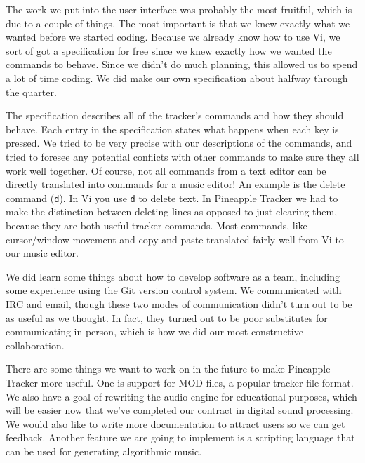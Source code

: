 \documentclass[12pt,letterpaper]{article}
\begin{document}

\par
The work we put into the user interface was probably the most fruitful, which is due to a couple of things.
The most important is that we knew exactly what we wanted before we started coding.
Because we already know how to use Vi, we sort of got a specification for free since we knew exactly how we wanted the commands to behave.
Since we didn't do much planning, this allowed us to spend a lot of time coding.
We did make our own specification about halfway through the quarter.

\par
The specification describes all of the tracker's commands and how they should behave.
Each entry in the specification states what happens when each key is pressed.
We tried to be very precise with our descriptions of the commands, and tried to foresee any potential conflicts with other commands to make sure they all work well together.
Of course, not all commands from a text editor can be directly translated into commands for a music editor!
An example is the delete command ({\tt d}).
In Vi you use {\tt d} to delete text.
In Pineapple Tracker we had to make the distinction between deleting lines as opposed to just clearing them, because they are both useful tracker commands.
Most commands, like cursor/window movement and copy and paste translated fairly well from Vi to our music editor.

\par
We did learn some things about how to develop software as a team, including some experience using the Git version control system.
We communicated with IRC and email, though these two modes of communication didn't turn out to be as useful as we thought.
In fact, they turned out to be poor substitutes for communicating in person, which is how we did our most constructive collaboration.

\par
There are some things we want to work on in the future to make Pineapple Tracker more useful.
One is support for MOD files, a popular tracker file format.
We also have a goal of rewriting the audio engine for educational purposes, which will be easier now that we've completed our contract in digital sound processing.
We would also like to write more documentation to attract users so we can get feedback.
Another feature we are going to implement is a scripting language that can be used for generating algorithmic music.
\end{document}
